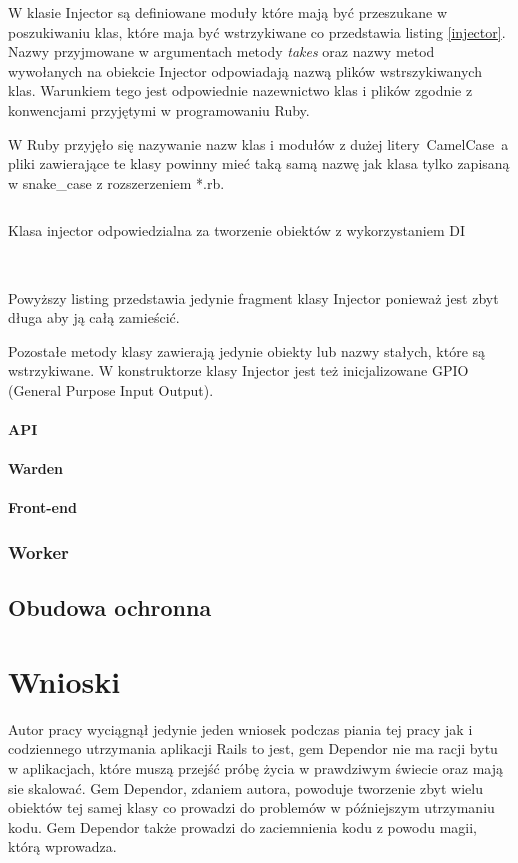 \documentclass[11pt,a4paper, twoside]{article}
\begin{document}
W klasie Injector są definiowane moduły które mają być przeszukane w poszukiwaniu klas, które maja być wstrzykiwane co przedstawia listing \ref{injector}. Nazwy przyjmowane w argumentach metody \emph{takes} oraz nazwy metod wywołanych na obiekcie Injector odpowiadają nazwą plików wstrszykiwanych klas. Warunkiem tego jest odpowiednie nazewnictwo klas i plików zgodnie z konwencjami przyjętymi w programowaniu Ruby.

W Ruby przyjęło się nazywanie nazw klas i modułów z dużej litery~CamelCase~a pliki zawierające te klasy powinny mieć taką samą nazwę jak klasa tylko zapisaną w snake\_case z rozszerzeniem *.rb.
\begin{listing}[H]
\inputminted[linenos=true]{ruby}{./src/injector.rb}
\caption{Klasa injector odpowiedzialna za tworzenie obiektów z wykorzystaniem DI}
$\label{injector}$
\end{listing}
\noindent
Powyższy listing przedstawia jedynie fragment klasy Injector ponieważ jest zbyt długa aby ją całą zamieścić. 

Pozostałe metody klasy zawierają jedynie obiekty lub nazwy stałych, które są wstrzykiwane. W konstruktorze klasy Injector jest też inicjalizowane GPIO (General Purpose Input Output).
\newpage
\paragraph{API}
\paragraph{Warden}
\paragraph{Front-end}
\subsubsection{Worker}
\subsection{Obudowa ochronna}
\section{Wnioski}
Autor pracy wyciągnął jedynie jeden wniosek podczas piania tej pracy jak i codziennego utrzymania aplikacji Rails to jest, gem Dependor nie ma racji bytu w aplikacjach, które muszą przejść próbę życia w prawdziwym świecie oraz mają sie skalować. Gem Dependor, zdaniem autora, powoduje tworzenie zbyt wielu obiektów tej samej klasy co prowadzi do problemów w późniejszym utrzymaniu kodu. Gem Dependor także prowadzi do zaciemnienia kodu z powodu magii, którą wprowadza.
\newpage
\end{document}
